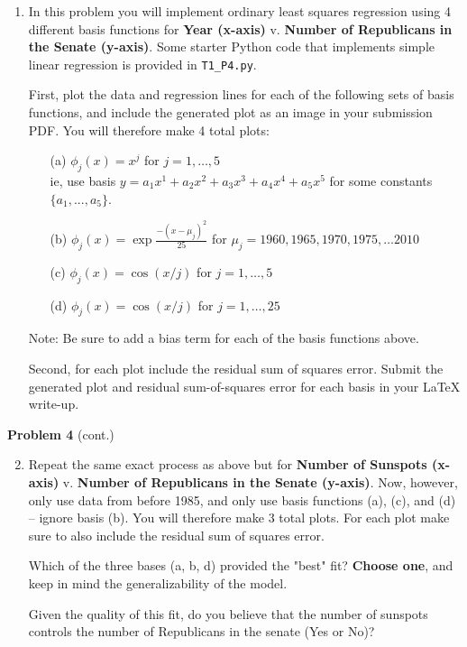 \documentclass[submit]{harvardml}
\begin{document}
\begin{problem}
\begin{enumerate}
\item In this problem you will implement ordinary least squares regression using 4 different basis functions for
\textbf{Year (x-axis)} v. \textbf{Number of Republicans in the Senate (y-axis)}. Some starter Python code
that implements simple linear regression is provided in \verb|T1_P4.py|.

First, plot the data and regression lines for each of the following sets of basis functions, and include
the generated plot as an image in your submission PDF. You will therefore make 4 total plots:
\begin{enumerate}
	\item[(a)] $\phi_j(x) = x^j$ for $j=1, \ldots, 5$\\
    ie, use basis $y = a_1 x^1 + a_2 x^2 + a_3 x^3 + a_4 x^4 + a_5 x^5$ for some constants $\{a_1, ..., a_5\}$. 
    \item[(b)] $\phi_j(x) = \exp{\frac{-(x-\mu_j)^2}{25}}$ for $\mu_j=1960, 1965, 1970, 1975, \ldots 2010$
	\item[(c)] $\phi_j(x) = \cos(x / j)$ for $j=1, \ldots, 5$
	\item[(d)] $\phi_j(x) = \cos(x / j)$ for $j=1, \ldots, 25$
\end{enumerate}
\vspace{-2mm}
{\footnotesize * Note: Be sure to add a bias term for each of the basis functions above.}

Second, for each plot include the residual sum of squares error. Submit the generated plot and residual sum-of-squares error for each basis in your LaTeX write-up.
\end{enumerate}

\end{problem}

\begin{framed}
\noindent\textbf{Problem 4} (cont.)\\
\begin{enumerate}
\setcounter{enumi}{1}
\item Repeat the same exact process as above but for \textbf{Number of Sunspots (x-axis)} v. \textbf{Number of Republicans in the Senate (y-axis)}. 
Now, however, only use data from before 1985, and only use basis functions (a), (c), and (d) -- ignore basis (b). You will therefore make 3 total plots. For each plot make sure to also include the residual sum of squares error.

Which of the three bases (a, b, d) provided the "best" fit? \textbf{Choose one}, and keep in mind the generalizability of the model. 

Given the quality of this fit, do you believe that the number of sunspots controls the number of Republicans in the senate (Yes or No)?
\end{enumerate}
\end{framed}
\end{document}

